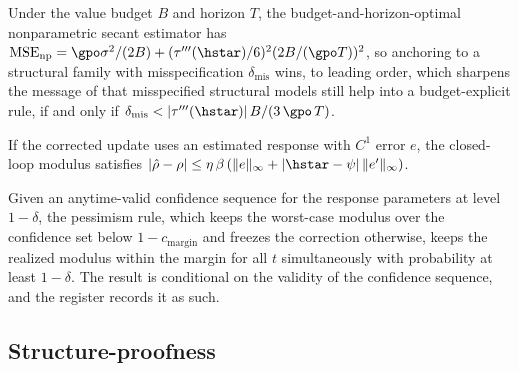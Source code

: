 \begin{theorem}
\label{thm:t7}
Under the value budget $B$ and horizon $T$, the budget-and-horizon-optimal
nonparametric secant estimator has
$\mathrm{MSE}_{\mathrm{np}} = \gpo\sigma^2/(2B) + (\tau'''(\hstar)/6)^2
(2B/(\gpo T))^2$, so anchoring to a structural family with misspecification
$\delta_{\mathrm{mis}}$ wins, to leading order, which sharpens the message of
\citet{lin2024plugin} that misspecified structural models still help into a
budget-explicit rule, if and only if
$\delta_{\mathrm{mis}} < |\tau'''(\hstar)|\,B/(3\,\gpo\,T)$.
\end{theorem}

\begin{lemma}
\label{lem:l4}
If the corrected update uses an estimated response with $C^1$ error $e$, the
closed-loop modulus satisfies $|\hat\rho - \rho| \le \eta\,\beta\,
(\|e\|_\infty + |\hstar-\psi|\,\|e'\|_\infty)$.
\end{lemma}

\begin{proposition}
\label{prop:p71}
Given an anytime-valid confidence sequence for the response parameters at
level $1-\delta$, the pessimism rule, which keeps the worst-case modulus over
the confidence set below $1 - c_{\mathrm{margin}}$ and freezes the correction
otherwise, keeps the realized modulus within the margin for all $t$
simultaneously with probability at least $1-\delta$. The result is
conditional on the validity of the confidence sequence, and the register
records it as such.
\end{proposition}

\subsection{Structure-proofness}

